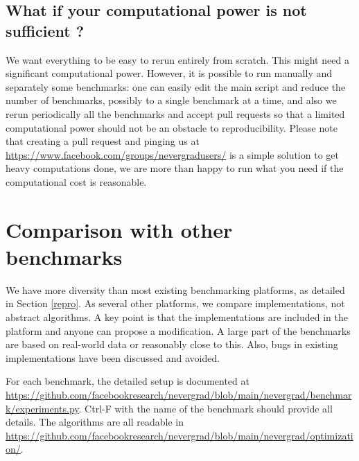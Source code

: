 \documentclass{article}
\begin{document}
\subsection{What if your computational power is not sufficient ?}
We want everything to be easy to rerun entirely from scratch. This might need a significant computational power.  However, it is possible to run manually and separately some benchmarks: one can easily edit the main script and reduce the number of benchmarks, possibly to a single benchmark at a time, and also we rerun periodically all the benchmarks and accept pull requests so that a limited computational power should not be an obstacle to reproducibility.
Please note that creating a pull request and pinging us at \url{https://www.facebook.com/groups/nevergradusers/} is a simple solution to get heavy computations done, we are more than happy to run what you need if the computational cost is reasonable. 

\section{Comparison with other benchmarks}
We have more diversity than most existing benchmarking platforms, as detailed in Section \ref{repro}.
As several other platforms, we compare implementations, not abstract algorithms.  A key point is that the implementations are included in the platform and anyone can propose a modification.
A large part of the benchmarks are based on real-world data or reasonably close to this.
Also, bugs in existing implementations have been discussed and avoided.

For each benchmark, the detailed setup is documented at \url{https://github.com/facebookresearch/nevergrad/blob/main/nevergrad/benchmark/experiments.py}.
Ctrl-F with the name of the benchmark should provide all details.
The algorithms are all readable in  \url{https://github.com/facebookresearch/nevergrad/blob/main/nevergrad/optimization/}.
\end{document}

